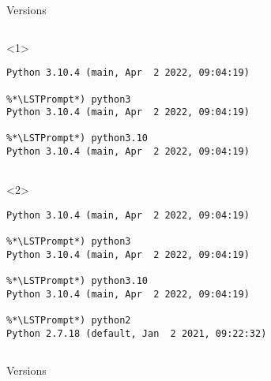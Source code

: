 \begin{frame}[fragile]{Versions}

  \begin{columns}[onlytextwidth]
    \begin{column}{\textwidth}

      \begin{onlyenv}<1>  %
        \begin{lstlisting}[style=sh]
%*\LSTPrompt*) python
Python 3.10.4 (main, Apr  2 2022, 09:04:19)

%*\LSTPrompt*) python3
Python 3.10.4 (main, Apr  2 2022, 09:04:19)

%*\LSTPrompt*) python3.10
Python 3.10.4 (main, Apr  2 2022, 09:04:19)


 \end{lstlisting}
      \end{onlyenv}

      \begin{onlyenv}<2>  %
        \begin{lstlisting}[style=sh]
%*\LSTPrompt*) python
Python 3.10.4 (main, Apr  2 2022, 09:04:19)

%*\LSTPrompt*) python3
Python 3.10.4 (main, Apr  2 2022, 09:04:19)

%*\LSTPrompt*) python3.10
Python 3.10.4 (main, Apr  2 2022, 09:04:19)

%*\LSTPrompt*) python2
Python 2.7.18 (default, Jan  2 2021, 09:22:32) \end{lstlisting}
      \end{onlyenv}

    \end{column}
  \end{columns}
\end{frame}


\begin{frame}[fragile]{Versions}

  \begin{center}


  \end{center}

\end{frame}
